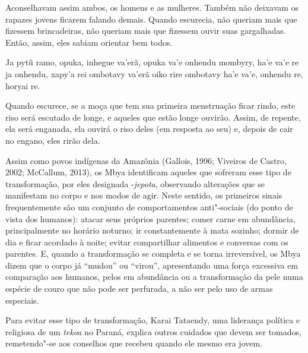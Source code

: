 \begin{paracol}{2}
\bigskip

\switchcolumn
\noindent
Aconselhavam assim ambos, os homens e as mulheres. Também não deixavam
os rapazes jovens ficarem falando demais. Quando escurecia, não queriam
mais que fizessem brincadeiras, não queriam mais que fizessem ouvir
suas gargalhadas. Então, assim, eles sabiam orientar bem todos. 

\smallskip

\switchcolumn
\noindent
Ja pytũ ramo, opuka, inhegue va’erã, opuka va’e onhendu mombyry, ha’e
va’e re ja onhendu, xapy’a rei ombotavy va’erã oiko rire ombotavy ha’e
va’e, onhendu re, horyai re.

\bigskip

\switchcolumn
\noindent
Quando escurece, se a moça que tem sua primeira menstruação ficar rindo,
este riso será escutado de longe, e aqueles que estão longe ouvirão.
Assim, de repente, ela será enganada, ela ouvirá o riso deles (em
resposta ao seu) e, depois de cair no engano, eles rirão
dela.\footnotemark{}
\end{paracol}

Assim como povos indígenas da Amazônia (Gallois, 1996; Viveiros de
Castro, 2002; McCallum, 2013), os Mbya identificam aqueles que sofreram
esse tipo de transformação, por eles designada -\emph{jepota}, observando
alterações que se manifestam no corpo e nos modos de agir. Neste
sentido, os primeiros sinais frequentemente são um conjunto de
comportamentos anti"-sociais (do ponto de vista dos humanos): atacar
seus próprios parentes; comer carne em abundância, principalmente no
horário noturno; ir constantemente à mata sozinho; dormir de dia e
ficar acordado à noite; evitar compartilhar alimentos e conversas com
os parentes. E, quando a transformação se completa e se torna
irreversível, os Mbya dizem que o corpo já ``mudou'' ou ``virou'',
apresentando uma força excessiva em comparação aos humanos, pelos em
abundância ou a transformação da pele numa espécie de couro que não
pode ser perfurada, a não ser pelo uso de armas especiais. 

Para evitar esse tipo de transformação, Karai Tataendy, uma liderança
política e religiosa de um \emph{tekoa} no Paraná, explica outros cuidados que
devem ser tomados, remetendo"-se aos conselhos que recebeu quando ele
mesmo era jovem. 

